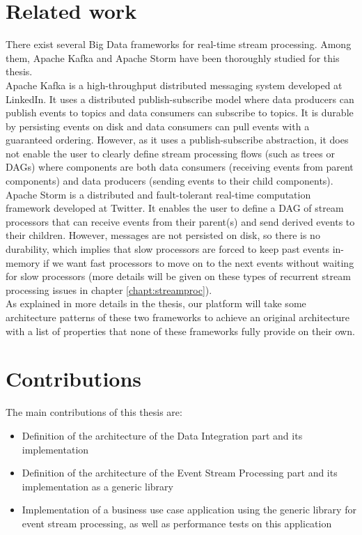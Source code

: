 \section{Related work}

There exist several Big Data frameworks for real-time stream processing. Among them, Apache Kafka  and Apache Storm  have been thoroughly studied for this thesis.
\\

Apache Kafka is a high-throughput distributed messaging system developed at LinkedIn. It uses a distributed publish-subscribe model where data producers can publish events to topics and data consumers can subscribe to topics. It is durable by persisting events on disk and data consumers can pull events with a guaranteed ordering. However, as it uses a publish-subscribe abstraction, it does not enable the user to clearly define stream processing flows (such as trees or DAGs) where components are both data consumers (receiving events from parent components) and data producers (sending events to their child components).
\\

Apache Storm is a distributed and fault-tolerant real-time computation framework developed at Twitter. It enables the user to define a DAG of stream processors that can receive events from their parent(s) and send derived events to their children. However, messages are not persisted on disk, so there is no durability, which implies that slow processors are forced to keep past events in-memory if we want fast processors to move on to the next events without waiting for slow processors (more details will be given on these types of recurrent stream processing issues in chapter \ref{chapt:streamproc}).
\\

As explained in more details in the thesis, our platform will take some architecture patterns of these two frameworks to achieve an original architecture with a list of properties that none of these frameworks fully provide on their own.

\section{Contributions}

The main contributions of this thesis are:
\begin{itemize}
  \item Definition of the architecture of the Data Integration part and its implementation
  \item Definition of the architecture of the Event Stream Processing part and its implementation as a generic library
  \item Implementation of a business use case application using the generic library for event stream processing, as well as performance tests on this application
\end{itemize}




